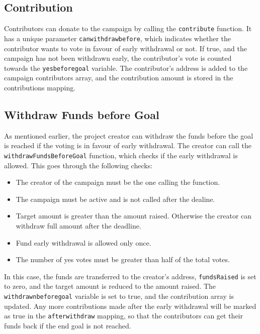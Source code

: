 \documentclass[12pt,reqno]{article}
\begin{document}
\subsection{Contribution}
Contributors can donate to the campaign by calling the \texttt{contribute} function. It has a unique 
parameter \texttt{canwithdrawbefore}, which indicates whether the contributor wants to vote in favour
of early withdrawal or not. If true, and the campaign has not been withdrawn early, the contributor's 
vote is counted towards the \texttt{yesbeforegoal} variable. The contributor's address is added to the
campaign contributors array, and the contribution amount is stored in the contributions mapping. 

\subsection{Withdraw Funds before Goal}
As mentioned earlier, the project creator can withdraw the funds before the goal is reached if the
voting is in favour of early withdrawal. The creator can call the \texttt{withdrawFundsBeforeGoal}
function, which checks if the early withdrawal is allowed. This goes through the following checks: \\ 
\begin{itemize}
    \item The creator of the campaign must be the one calling the function.
    \item The campaign must be active and is not called after the dealine. 
    \item Target amount is greater than the amount raised. Otherwise the creator can withdraw full amount 
    after the deadline. 
    \item Fund early withdrawal is allowed only once.
    \item The number of yes votes must be greater than half of the total votes.
\end{itemize}    
In this case, the funds are transferred to the creator's address, \texttt{fundsRaised} is set to zero, 
and the target amount is reduced to the amount raised. The \texttt{withdrawnbeforegoal} variable is set to true, and the contribution 
array is updated. Any more contributions made after the early withdrawal will be marked as true in the 
\texttt{afterwithdraw} mapping, so that the contributors can get their funds back if the end goal 
is not reached. 
\end{document}
